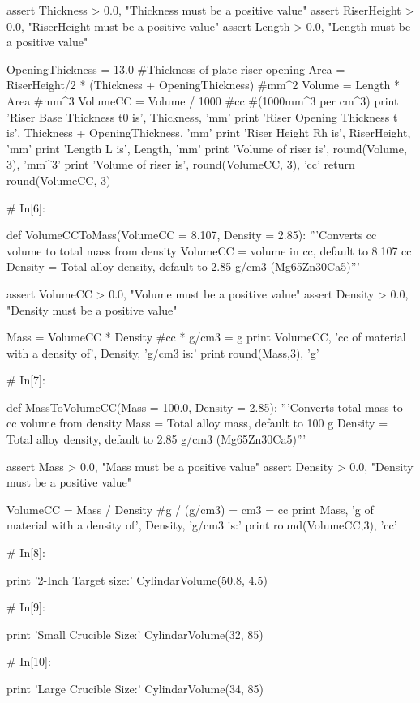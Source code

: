 \documentclass[a4paper,8pt]{article}
\begin{document}
\begin{python}
	assert Thickness > 0.0, "Thickness must be a positive value"
	assert RiserHeight > 0.0, "RiserHeight must be a positive value"
	assert Length > 0.0, "Length must be a positive value"
	
	OpeningThickness = 13.0 #Thickness of plate riser opening
	Area = RiserHeight/2 * (Thickness + OpeningThickness) #mm^2
	Volume = Length * Area #mm^3
	VolumeCC = Volume / 1000 #cc #(1000mm^3 per cm^3)
	print 'Riser Base Thickness t0 is', Thickness, 'mm'
	print 'Riser Opening Thickness t is', Thickness + OpeningThickness, 'mm'
	print 'Riser Height Rh is', RiserHeight, 'mm'
	print 'Length L is', Length, 'mm'
	print 'Volume of riser is', round(Volume, 3), 'mm^3'
	print 'Volume of riser is', round(VolumeCC, 3), 'cc'
	return round(VolumeCC, 3)
	
	
	# In[6]:
	
	def VolumeCCToMass(VolumeCC = 8.107, Density = 2.85):
	'''Converts cc volume to total mass from density 
	VolumeCC = volume in cc, default to 8.107 cc
	Density = Total alloy density, default to 2.85 g/cm3 (Mg65Zn30Ca5)'''
	
	assert VolumeCC > 0.0, "Volume must be a positive value"
	assert Density > 0.0, "Density must be a positive value"
	
	Mass = VolumeCC * Density #cc * g/cm3 = g
	print VolumeCC, 'cc of material with a density of', Density, 'g/cm3 is:'
	print round(Mass,3), 'g'
	
	
	# In[7]:
	
	def MassToVolumeCC(Mass = 100.0, Density = 2.85):
	'''Converts total mass to cc volume from density 
	Mass = Total alloy mass, default to 100 g
	Density = Total alloy density, default to 2.85 g/cm3 (Mg65Zn30Ca5)'''
	
	assert Mass > 0.0, "Mass must be a positive value"
	assert Density > 0.0, "Density must be a positive value"
	
	VolumeCC = Mass / Density #g / (g/cm3) = cm3 = cc
	print Mass, 'g of material with a density of', Density, 'g/cm3 is:'
	print round(VolumeCC,3), 'cc'
	
	
	# In[8]:
	
	print '2-Inch Target size:'
	CylindarVolume(50.8, 4.5)
	
	
	# In[9]:
	
	print 'Small Crucible Size:'
	CylindarVolume(32, 85)
	
	
	# In[10]:
	
	print 'Large Crucible Size:'
	CylindarVolume(34, 85)
	
\end{python}
\end{document}
